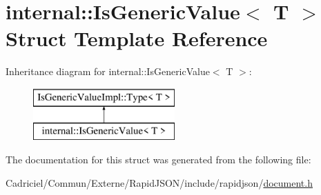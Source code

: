 \hypertarget{structinternal_1_1_is_generic_value}{}\section{internal\+:\+:Is\+Generic\+Value$<$ T $>$ Struct Template Reference}
\label{structinternal_1_1_is_generic_value}
Inheritance diagram for internal\+:\+:Is\+Generic\+Value$<$ T $>$\+:\begin{figure}[H]
\begin{center}
\leavevmode
\includegraphics[height=2.000000cm]{structinternal_1_1_is_generic_value}
\end{center}
\end{figure}


The documentation for this struct was generated from the following file\+:\begin{DoxyCompactItemize}
\item 
Cadriciel/\+Commun/\+Externe/\+Rapid\+J\+S\+O\+N/include/rapidjson/\hyperlink{document_8h}{document.\+h}\end{DoxyCompactItemize}
